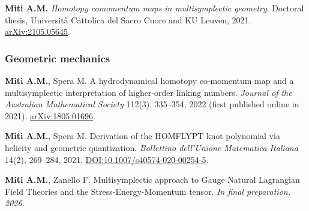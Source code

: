 \documentclass[a4paper,fontsize=11bp]{scrartcl}
\newenvironment{refsection}{\begingroup}{\endgroup}
\begin{document}
\begin{refsection}
\begin{ERCoutputlist}
\setcounter{ERCselectedoutput}{5}
\item \textbf{Miti A.M.}
\emph{Homotopy comomentum maps in multisymplectic geometry}.
Doctoral thesis, Universit\`a Cattolica del Sacro Cuore and KU Leuven, 2021.
\href{https://arxiv.org/abs/2105.05645}{arXiv:2105.05645}.

\end{ERCoutputlist}

\subsubsection*{Geometric mechanics}

%
\begin{ERCoutputlist}
\setcounter{ERCselectedoutput}{6}
\item \textbf{Miti A.M.}, Spera M.
A hydrodynamical homotopy co-momentum map and a multisymplectic interpretation
of higher-order linking numbers.
\emph{Journal of the Australian Mathematical Society} 112(3), 335--354, 2022
(first published online in 2021).
\href{https://arxiv.org/abs/1805.01696}{arXiv:1805.01696}.

\setcounter{ERCselectedoutput}{7}
\item \textbf{Miti A.M.}, Spera M.
Derivation of the HOMFLYPT knot polynomial via helicity and geometric quantization.
\emph{Bollettino dell'Unione Matematica Italiana} 14(2), 269--284, 2021.
\href{https://doi.org/10.1007/s40574-020-00254-5}{DOI:10.1007/s40574-020-00254-5}.

\setcounter{ERCselectedoutput}{8}
\item \textbf{Miti A.M.}, Zanello F.
Multisymplectic approach to Gauge Natural Lagrangian Field Theories and the
Stress-Energy-Momentum tensor.
\emph{In final preparation, 2026.}


\end{ERCoutputlist}
\end{refsection}
\end{document}
